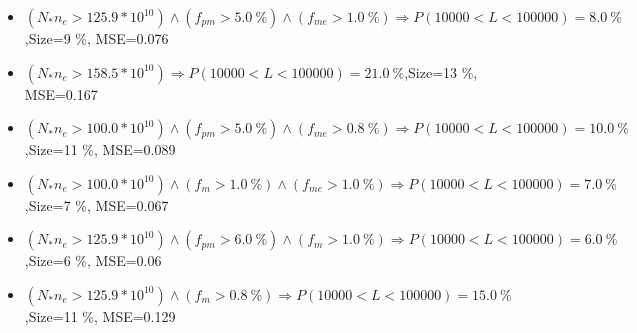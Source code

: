 \documentclass[numbered]{CSL}
\begin{document}
\begin{itemize}
\item $(N_* n_e > 125.9 * 10^{10}) \land (f_{pm} > 5.0~\%) \land (f_{me} > 1.0~\%) \Rightarrow P(10 000 < L < 100 000) = 8.0~\%$,\hfill Size=9 \%, MSE=0.076
\item $(N_* n_e > 158.5 * 10^{10}) \Rightarrow P(10 000 < L < 100 000) = 21.0~\%$,\hfill Size=13 \%, MSE=0.167
\item $(N_* n_e > 100.0 * 10^{10}) \land (f_{pm} > 5.0~\%) \land (f_{me} > 0.8~\%) \Rightarrow P(10 000 < L < 100 000) = 10.0~\%$,\hfill Size=11 \%, MSE=0.089
\item $(N_* n_e > 100.0 * 10^{10}) \land (f_m > 1.0~\%) \land (f_{me} > 1.0~\%) \Rightarrow P(10 000 < L < 100 000) = 7.0~\%$,\hfill Size=7 \%, MSE=0.067
\item $(N_* n_e > 125.9 * 10^{10}) \land (f_{pm} > 6.0~\%) \land (f_m > 1.0~\%) \Rightarrow P(10 000 < L < 100 000) = 6.0~\%$,\hfill Size=6 \%, MSE=0.06
\item $(N_* n_e > 125.9 * 10^{10}) \land (f_m > 0.8~\%) \Rightarrow P(10 000 < L < 100 000) = 15.0~\%$,\hfill Size=11 \%, MSE=0.129
\end{itemize}
\end{document}
